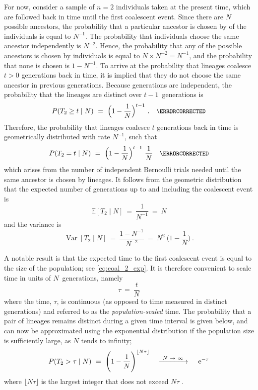 For now, consider a sample of ${n=2}$ individuals taken at the present time, which are followed back in time until the first coalescent event.
Since there are $N$ possible ancestors, the probability that a particular ancestor is chosen by  of the individuals is equal to $N^{-1}$.
The probability that  individuals choose the same ancestor independently is $N^{-2}$.
Hence, the probability that any of the possible ancestors is chosen by  individuals is equal to ${N \times N^{-2} = N^{-1}}$, and the probability that none is chosen is ${1 - N^{-1}}$.
To arrive at the probability that  lineages coalesce $t>0$ generations back in time, it is implied that they do not choose the same ancestor in previous generations.
Because generations are independent, the probability that the  lineages are distinct over $t-1$~generations is
\begin{equation}
	P(T_2 \geq t \mid N) ~=~ \Big( 1 - \frac{1}{N} \Big)^{t-1}
	\ \text{.} \medit
\end{equation}
Therefore, the probability that  lineages coalesce $t$ generations back in time is geometrically distributed with rate $N^{-1}$, such that
\begin{equation}\label{eq:coalprob}
	P(T_2 = t \mid N) ~=~ \Big( 1 - \frac{1}{N} \Big)^{t-1} ~ \frac{1}{N} \medit
\end{equation}
which arises from the number of independent Bernoulli trials needed until the same ancestor is chosen by  lineages.
It follows from the geometric distribution that the expected number of generations up to and including the coalescent event is
\begin{equation}\label{eq:coal_2_exp}
	\mathbb{E}[T_2 \mid N] ~=~ \frac{1}{N^{-1}} ~=~ N
\end{equation}
and the variance is
\begin{equation}\label{eq:coal_2_var}
	\operatorname{Var}[T_2 \mid N] ~=~ \frac{1 - N^{-1}}{N^{-2}} ~=~ N^2 ~ \Big( 1 - \frac{1}{N} \Big)
	\ \text{.}
\end{equation}

A notable result is that the expected time to the first coalescent event is equal to the size of the population; see \cref{eq:coal_2_exp}.
It is therefore convenient to scale time in units of $N$~generations, namely
\begin{equation}\label{eq:timescale}
	\tau ~=~ \frac{t}{N}
\end{equation}
where the time, $\tau$, is continuous (as opposed to time measured in distinct generations) and referred to as the \emph{population-scaled} time.
The probability that a pair of lineages remains distinct during a given time interval is given below, and can now be approximated using the exponential distribution if the population size is sufficiently large, \ie as $N$ tends to infinity;
\begin{equation}\label{eq:coal_2_dont}
	P(T_2 > \tau \mid N)
	~=~ \Bigg( 1 - \frac{1}{N} \Bigg)^{\lfloor N \tau \rfloor}
	\quad \xrightarrow{~ N~\rightarrow~\infty ~} \quad
	\,\mathrm{e}^{-\tau}
\end{equation}
where ${\lfloor N \tau \rfloor}$ is the largest integer that does not exceed ${N \tau}$ \citep[\eg, see][]{nordborg2001coalescent}.

